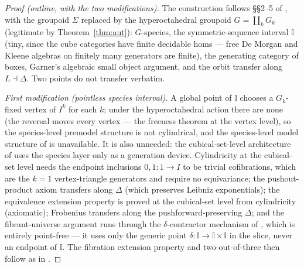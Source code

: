 \documentclass[11pt]{amsart}
\theoremstyle{definition}
\newcommand{\I}{\mathbb{I}}
\newcommand{\G}{G}
\begin{document}
\begin{proof}[Proof (outline, with the two modifications)]
  The construction follows §§2--5 of \cite{ACCRS}, with the
  groupoid $\Sigma$ replaced by the hyperoctahedral groupoid
  $\G = \coprod_k \G_k$ (legitimate by
  Theorem~\ref{thm:aut}): $\G$-species, the symmetric-sequence
  interval $\I$ (tiny, since the cube categories have finite
  decidable homs --- free De Morgan and Kleene algebras on finitely
  many generators are finite), the generating category of
  boxes, Garner's algebraic small object argument, and the orbit
  transfer along $L \dashv \Delta$.  Two points do not transfer
  verbatim.

  \emph{First modification (pointless species interval).}  A global
  point of $\I$ chooses a $\G_k$-fixed vertex of $I^k$ for each
  $k$; under the hyperoctahedral action there are none (the
  reversal moves every vertex --- the freeness theorem at the
  vertex level), so the species-level premodel structure is not
  cylindrical, and the species-level model structure of
  \cite[§4.4]{ACCRS} is unavailable.  It is also unneeded: the
  cubical-set-level architecture of \cite[§5]{ACCRS} uses the
  species layer only as a generation device.  Cylindricity at the
  cubical-set level needs the endpoint inclusions
  $0, 1 : 1 \to I$ to be trivial cofibrations, which are the
  $k = 1$ vertex-triangle generators and require no equivariance;
  the pushout-product axiom transfers along $\Delta$ (which
  preserves Leibniz exponentials); the equivalence extension
  property is proved at the cubical-set level from cylindricity
  (axiomatic); Frobenius transfers along the
  pushforward-preserving $\Delta$; and the fibrant-universe
  argument runs through the $\delta$-contractor mechanism of
  \cite[§3.6]{ACCRS}, which is entirely point-free --- it uses
  only the generic point $\delta : \I \to \I \times \I$ in the
  slice, never an endpoint of $\I$.  The fibration extension
  property and two-out-of-three then follow as in
  \cite[§5.3]{ACCRS}.


\end{proof}
\end{document}
